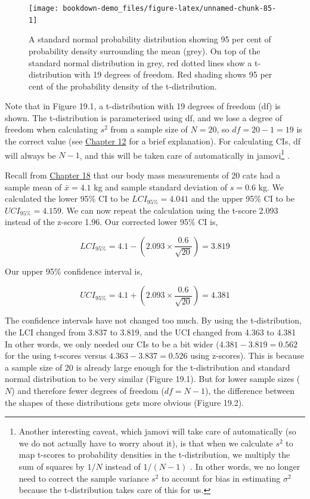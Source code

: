 \documentclass[
]{scrbook}
\begin{document}
\begin{figure}
\texttt{[image: bookdown-demo\_files/figure-latex/unnamed-chunk-85-1]} \caption{A standard normal probability distribution showing 95 per cent of probability density surrounding the mean (grey). On top of the standard normal distribution in grey, red dotted lines show a t-distribution with 19 degrees of freedom. Red shading shows 95 per cent of the probability density of the t-distribution.}\label{fig:unnamed-chunk-85}
\end{figure}

Note that in Figure 19.1, a t-distribution with 19 degrees of freedom (df) is shown.
The t-distribution is parameterised using df, and we lose a degree of freedom when calculating \(s^{2}\) from a sample size of \(N = 20\), so \(df = 20 - 1 = 19\) is the correct value (see \protect\hyperlink{Chapter_12}{Chapter 12} for a brief explanation).
For calculating CIs, df will always be \(N - 1\), and this will be taken care of automatically in jamovi\footnote{Another interesting caveat, which jamovi will take care of automatically (so we do not actually have to worry about it), is that when we calculate \(s^{2}\) to map t-scores to probability densities in the t-distribution, we multiply the sum of squares by \(1/N\) instead of \(1/(N-1)\) \citep{Sokal1995}. In other words, we no longer need to correct the sample variance \(s^{2}\) to account for bias in estimating \(\sigma^{2}\) because the t-distribution takes care of this for us.} \citep{Jamovi2022}.

Recall from \protect\hyperlink{Chapter_18}{Chapter 18} that our body mass measurements of 20 cats had a sample mean of \(\bar{x} = 4.1\) kg and sample standard deviation of \(s = 0.6\) kg. We calculated the lower 95\% CI to be \(LCI_{95\%} = 4.041\) and the upper 95\% CI to be \(UCI_{95\%} = 4.159\). We can now repeat the calculation using the t-score 2.093 instead of the z-score 1.96.
Our corrected lower 95\% CI is,

\[LCI_{95\%} = 4.1 - \left(2.093 \times \frac{0.6}{\sqrt{20}}\right) = 3.819\]

Our upper 95\% confidence interval is,

\[UCI_{95\%} = 4.1 + \left(2.093 \times \frac{0.6}{\sqrt{20}}\right) = 4.381\]

The confidence intervals have not changed too much.
By using the t-distribution, the LCI changed from 3.837 to 3.819, and the UCI changed from 4.363 to 4.381
In other words, we only needed our CIs to be a bit wider (\(4.381 - 3.819 = 0.562\) for the using t-scores versus \(4.363 - 3.837 = 0.526\) using z-scores).
This is because a sample size of 20 is already large enough for the t-distribution and standard normal distribution to be very similar (Figure 19.1).
But for lower sample sizes (\(N\)) and therefore fewer degrees of freedom (\(df = N - 1\)), the difference between the shapes of these distributions gets more obvious (Figure 19.2).
\end{document}
